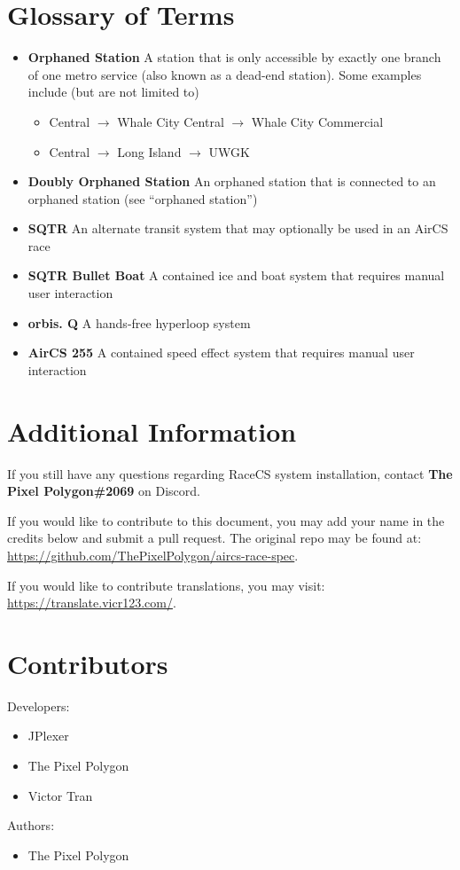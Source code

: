 \documentclass{article}
\newcommand{\defterm}[2]{\textbf{#1} #2}
\begin{document}
\pagebreak

\section{Glossary of Terms}
\begin{itemize}
    \item \defterm{Orphaned Station}{A station that is only accessible by exactly one branch of one metro service (also known as a dead-end station). Some examples include (but are not limited to)}
    \begin{itemize}
        \item Central $\rightarrow$ Whale City Central $\rightarrow$ Whale City Commercial
        \item Central $\rightarrow$ Long Island $\rightarrow$ UWGK
    \end{itemize}
    \item \defterm{Doubly Orphaned Station}{An orphaned station that is connected to an orphaned station (see ``orphaned station'')}
    \item \defterm{SQTR}{An alternate transit system that may optionally be used in an AirCS race}
    \item \defterm{SQTR Bullet Boat}{A contained ice and boat system that requires manual user interaction}
    \item \defterm{orbis. Q}{A hands-free hyperloop system}
    \item \defterm{AirCS 255}{A contained speed effect system that requires manual user interaction}
\end{itemize}

\pagebreak

\section{Additional Information}
If you still have any questions regarding RaceCS system installation, contact \textbf{The Pixel Polygon\#2069} on Discord.

\medskip

If you would like to contribute to this document, you may add your name in the credits below and submit a pull request. The original repo may be found at: \url{https://github.com/ThePixelPolygon/aircs-race-spec}.

\medskip

If you would like to contribute translations, you may visit: \url{https://translate.vicr123.com/}.

\pagebreak

\section{Contributors}
Developers:
\begin{itemize}
    \item JPlexer
    \item The Pixel Polygon
    \item Victor Tran
\end{itemize}
Authors:
\begin{itemize}
    \item The Pixel Polygon
\end{itemize}
\end{document}
